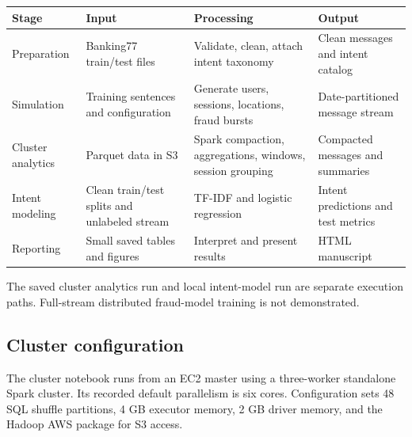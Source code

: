 \documentclass[
  english,
  11pt,
  letterpaper,
]{article}
\newcounter{none} %
\begin{document}
{\def\LTcaptype{none} %
\begin{longtable}[]{@{}
  >{\raggedright\arraybackslash}p{}
  >{\raggedright\arraybackslash}p{}
  >{\raggedright\arraybackslash}p{}
  >{\raggedright\arraybackslash}p{}@{}}
\toprule\noalign{}
\begin{minipage}[b]{\linewidth}\raggedright
Stage
\end{minipage} & \begin{minipage}[b]{\linewidth}\raggedright
Input
\end{minipage} & \begin{minipage}[b]{\linewidth}\raggedright
Processing
\end{minipage} & \begin{minipage}[b]{\linewidth}\raggedright
Output
\end{minipage} \\
\midrule\noalign{}
\endhead
\bottomrule\noalign{}
\endlastfoot
Preparation & Banking77 train/test files & Validate, clean, attach
intent taxonomy & Clean messages and intent catalog \\
Simulation & Training sentences and configuration & Generate users,
sessions, locations, fraud bursts & Date-partitioned message stream \\
Cluster analytics & Parquet data in S3 & Spark compaction, aggregations,
windows, session grouping & Compacted messages and summaries \\
Intent modeling & Clean train/test splits and unlabeled stream & TF-IDF
and logistic regression & Intent predictions and test metrics \\
Reporting & Small saved tables and figures & Interpret and present
results & HTML manuscript \\
\end{longtable}
}

The saved cluster analytics run and local intent-model run are separate
execution paths. Full-stream distributed fraud-model training is not
demonstrated.

\subsection{Cluster configuration}\label{cluster-configuration}

The cluster notebook runs from an EC2 master using a three-worker
standalone Spark cluster. Its recorded default parallelism is six cores.
Configuration sets 48 SQL shuffle partitions, 4 GB executor memory, 2 GB
driver memory, and the Hadoop AWS package for S3 access.
\end{document}
